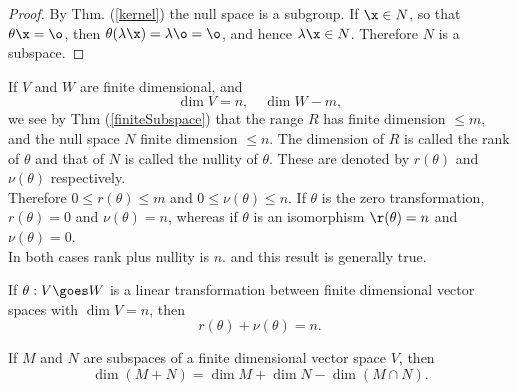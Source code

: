 \begin{proof}
By Thm. (\ref{kernel}) the null space is a subgroup. If $\x \in N$, so that $\theta \x = \o$, then $\theta(\lambda\x) = \lambda \o = \o$, and hence $\lambda \x \in N$. Therefore $N$ is a subspace. 
\end{proof}

If $V$ and $W$ are finite dimensional, and \[ \dim V = n, \quad \dim W - m,\]  we see by Thm (\ref{finiteSubspace}) that the range $R$ has finite dimension $\le m$, and the null space $N$ finite dimension $\le n$. The dimension of $R$ is 
called the {\twelveit rank of } $\theta$ and that of $N$ is called the {\twelveit nullity  of } $\theta$. These are denoted by $r(\theta)$ and $\nu(\theta)$ respectively. \\

Therefore $0 \le r(\theta) \le m$ and $0 \le \nu(\theta) \le n$. If $\theta$ is the zero transformation, $r(\theta) = 0$ and $\nu(\theta) = n$, whereas if $\theta$ is an isomorphism $\r(\theta) = n$ and $\nu(\theta) = 0$. \\

In both cases rank plus nullity is $n$. and this result is generally true. 

\begin{theorem} If $\theta : V \goes W$ is a linear transformation between finite dimensional vector spaces with $\dim V = n$, then 
\[ r(\theta) + \nu(\theta) = n.\]
\end{theorem}

\begin{theorem}
If $M$ and $N$ are subspaces of a finite dimensional vector space $V$, then 
\[ \dim(M + N) = \dim M + \dim N - \dim (M\cap N).\] 
\label{Grassmann}\end{theorem}


